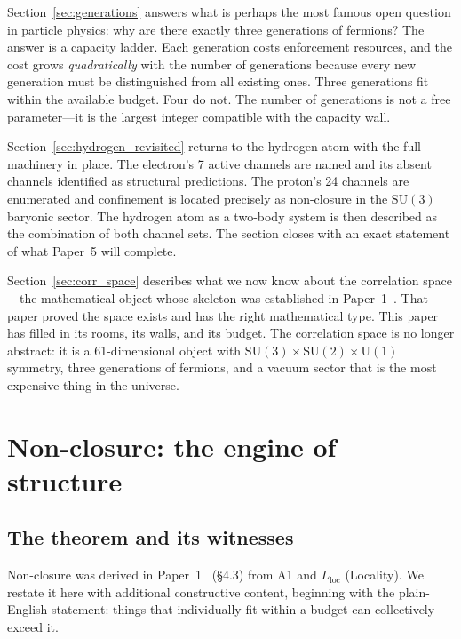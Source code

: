 \documentclass[11pt]{article}
\newcommand{\SU}{\mathrm{SU}}
\newcommand{\U}{\mathrm{U}}
\begin{document}
Section~\ref{sec:generations} answers what is perhaps the most famous open question in particle physics: why are there exactly three generations of fermions?  The answer is a capacity ladder.  Each generation costs enforcement resources, and the cost grows \emph{quadratically} with the number of generations because every new generation must be distinguished from all existing ones.  Three generations fit within the available budget.  Four do not.  The number of generations is not a free parameter---it is the largest integer compatible with the capacity wall.

Section~\ref{sec:hydrogen_revisited} returns to the hydrogen atom with the full machinery in place.  The electron's 7 active channels are named and its absent channels identified as structural predictions.  The proton's 24 channels are enumerated and confinement is located precisely as non-closure in the $\SU(3)$ baryonic sector.  The hydrogen atom as a two-body system is then described as the combination of both channel sets.  The section closes with an exact statement of what Paper~5 will complete.

Section~\ref{sec:corr_space} describes what we now know about the correlation space---the mathematical object whose skeleton was established in Paper~1~\cite{BrookePaper1}.  That paper proved the space exists and has the right mathematical type.  This paper has filled in its rooms, its walls, and its budget.  The correlation space is no longer abstract: it is a 61-dimensional object with $\SU(3) \times \SU(2) \times \U(1)$ symmetry, three generations of fermions, and a vacuum sector that is the most expensive thing in the universe.


\section{Non-closure: the engine of structure}
\label{sec:nonclosure}

\subsection{The theorem and its witnesses}

Non-closure was derived in Paper~1~\cite{BrookePaper1} (\S4.3) from A1 and $L_{\mathrm{loc}}$ (Locality).  We restate it here with additional constructive content, beginning with the plain-English statement: things that individually fit within a budget can collectively exceed it.
\end{document}
